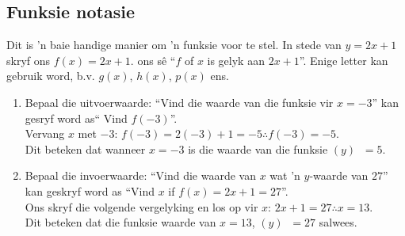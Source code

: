 \subsection*{Funksie notasie}
Dit is 'n baie handige manier om 'n funksie voor te stel. In stede van $y=2x+1$ skryf ons $f(x) = 2x+1$. ons s\^e  ``$f$ of $x$ is gelyk aan $2x+1$''. Enige letter kan gebruik word, b.v. $g(x)$, $h(x)$, $p(x)$ ens. 
\begin{enumerate}[noitemsep, label=\textbf{\arabic*}. ] 
 \item Bepaal die uitvoerwaarde: ``Vind die waarde van die funksie vir $x=-3$'' kan gesryf word as`` Vind $f(-3)$''.
\\Vervang $x$ met $-3$: $f(-3)=2(-3)+1=-5 \therefore f(-3)=-5$. \\
Dit beteken dat wanneer $x=-3$ is die waarde van die funksie $(y)$ $~=5$.
\item Bepaal die invoerwaarde: ``Vind die waarde van $x$ wat 'n $y$-waarde van $27$'' kan geskryf word as ``Vind $x$ if $f(x)=2x+1 = 27$''. \\
Ons skryf die volgende vergelyking en los op vir $x$: $2x+1 = 27 \therefore x=13$.\\
Dit beteken dat die funksie waarde van $x=13$, $(y)$ $~=27$ salwees.

\end{enumerate}

